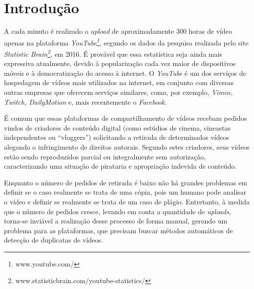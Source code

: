 \chapter{Introdução}
\label{chap:introducao}

A cada minuto é realizado o \textit{upload} de aproximadamente 300 horas de vídeo apenas na plataforma \textit{YouTube\footnote{www.youtube.com/}}, segundo os dados da pesquisa realizada pelo site \textit{Statistic Brain\footnote{www.statisticbrain.com/youtube-statistics/}}, em 2016. É provável que essa estatística seja ainda mais expressiva atualmente, devido à popularização cada vez maior de dispositivos móveis e à democratização do acesso à internet. O \textit{YouTube} é um dos serviços de hospedagem de vídeos mais utilizados na internet, em conjunto com diversas outras empresas que oferecem serviços similares, como, por exemplo, \textit{Vimeo, Twitch, DailyMotion} e, mais recentemente o \textit{Facebook}.

É comum que essas plataformas de compartilhamento de vídeos recebam pedidos vindos de criadores de conteúdo digital (como estúdios de cinema, cineastas independentes ou ``vloggers'') solicitando a retirada de determinados vídeos alegando o infringimento de direitos autorais. Segundo estes criadores, seus vídeos estão sendo reproduzidos parcial ou integralmente sem autorização, caracterizando uma situação de pirataria e apropriação indevida de conteúdo. 

Enquanto o número de pedidos de retirada é baixo não há grandes problemas em definir se o caso realmente se trata de uma cópia, pois um humano pode analisar o vídeo e definir se realmente se trata de um caso de plágio. Entretanto, à medida que o número de pedidos cresce, levando em conta a quantidade de \textit{uploads}, torna-se inviável a realização desse processo de forma manual, gerando um problema para as plataformas, que precisam buscar métodos automáticos de detecção de duplicatas de vídeos.


